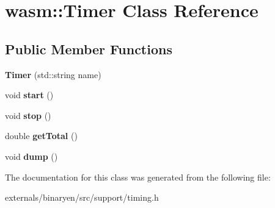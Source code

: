 \hypertarget{classwasm_1_1_timer}{}\section{wasm\+:\+:Timer Class Reference}
\label{classwasm_1_1_timer}
\subsection*{Public Member Functions}
\begin{DoxyCompactItemize}
\item 
\mbox{\label{classwasm_1_1_timer_ad7230f98e274179eeb56889ac98715f7}} 
{\bfseries Timer} (std\+::string name)
\item 
\mbox{\label{classwasm_1_1_timer_ac2a7786952d28dd9242351a278445291}} 
void {\bfseries start} ()
\item 
\mbox{\label{classwasm_1_1_timer_ac4478ae67cf4b6d54e8f6a4428322383}} 
void {\bfseries stop} ()
\item 
\mbox{\label{classwasm_1_1_timer_af8c5aa96897cf125107f257fb11de30a}} 
double {\bfseries get\+Total} ()
\item 
\mbox{\label{classwasm_1_1_timer_a49009d178cf2f2a15be76591dc5b2d6d}} 
void {\bfseries dump} ()
\end{DoxyCompactItemize}


The documentation for this class was generated from the following file\+:\begin{DoxyCompactItemize}
\item 
externals/binaryen/src/support/timing.\+h\end{DoxyCompactItemize}
